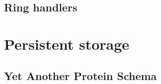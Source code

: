\subsection{Ring handlers}\label{subsec:ring-handler}


\section{Persistent storage}\label{sec:persistent-storage}


\subsection{Yet Another Protein Schema}\label{subsec:yaps}


\newpage
